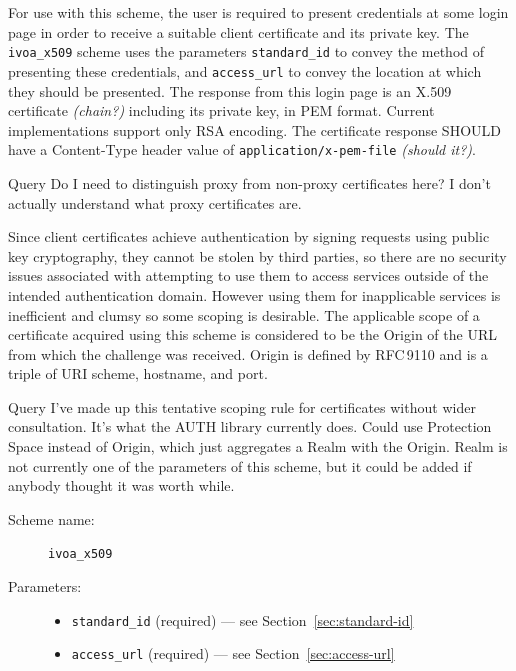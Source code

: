\documentclass[11pt,a4paper]{ivoa}
\newcommand{\rfc}[1]{RFC\,#1}
\begin{document}
For use with this scheme, the user is required to present credentials
at some login page in order to receive a suitable client certificate
and its private key.
The \verb|ivoa_x509| scheme uses the parameters 
\verb|standard_id| to convey the method of presenting these credentials, and
\verb|access_url| to convey the location at which they should be presented.
The response from this login page is an X.509 certificate {\em (chain?)\/}
including its private key, in PEM format.
Current implementations support only RSA encoding.
The certificate response SHOULD have a Content-Type header value of
{\tt application/x-pem-file} {\em (should it?)}.

\begin{admonition}{Query}
  Do I need to distinguish proxy from non-proxy certificates here?
  I don't actually understand what proxy certificates are.
\end{admonition}

Since client certificates achieve authentication by signing requests
using public key cryptography, they cannot be stolen by third parties,
so there are no security issues associated with attempting to use them
to access services outside of the intended authentication domain.
However using them for inapplicable services is inefficient and clumsy
so some scoping is desirable.
The applicable scope of a certificate acquired using this scheme is
considered to be the Origin of the URL from which
the challenge was received.
Origin is defined by \rfc{9110}
and is a triple of URI scheme, hostname, and port.
\begin{admonition}{Query}
I've made up this tentative scoping rule for certificates
without wider consultation.
It's what the AUTH library currently does.
Could use Protection Space instead of Origin, which just aggregates a
Realm with the Origin.
Realm is not currently one of the parameters of this scheme,
but it could be added if anybody thought it was worth while.
\end{admonition}

\begin{description}
  \item[Scheme name:] \verb|ivoa_x509|
  \item[Parameters:] \mbox{}
  \begin{itemize}
    \item \verb|standard_id| (required) --- see Section~\ref{sec:standard-id}
    \item \verb|access_url| (required) --- see Section~\ref{sec:access-url}
  \end{itemize}
\end{description}
\end{document}
